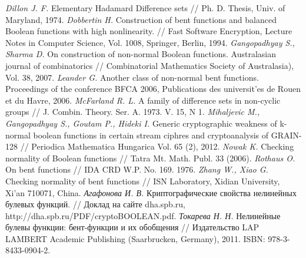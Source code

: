 \begin{thebibliography}{99}
 {\it Dillon J. F.} Elementary Hadamard Difference sets // Ph. D. Thesis, Univ. of Maryland, 1974.
 {\it Dobbertin H.} Construction of bent functions and balanced Boolean functions with high nonlinearity. // Fast Software Encryption, Lecture Notes in Computer Science, Vol. 1008, Springer, Berlin, 1994.
 {\it Gangopadhyay S., Sharma D.} On construction of non-normal Boolean functions. Australasian journal of combinatorics // Combinatorial Mathematics Society of Australasia), Vol. 38, 2007.
 {\it Leander G.} Another class of non-normal bent functions. Proceedings of the conference BFCA 2006, Publications des universit'es de Rouen et du Havre, 2006.
 {\it McFarland R. L.} A family of difference sets in non-cyclic groups // J. Combin. Theory. Ser. A. 1973. V. 15, N 1.
 {\it Mihaljevic M., Gangopadhyay S., Goutam P., Hideki I.} Generic cryptographic weakness of k-normal boolean functions in certain stream ciphres and cryptoanalysis of GRAIN-128 // Periodica Mathematica Hungarica Vol. 65 (2), 2012.
 {\it Nowak K.} Checking normality of Boolean functions // Tatra Mt. Math. Publ. 33 (2006).
 {\it Rothaus O.} On bent functions // IDA CRD W.P. No. 169. 1976.
 {\it Zhang W., Xiao G.} Checking normality of bent functions // ISN Laboratory, Xidian University, Xi’an 710071, China.
 {\it Агафонова И. В.} Криптографические свойства нелинейных булевых функций. // Доклад на сайте dha.spb.ru, http://dha.spb.ru/PDF/cryptoBOOLEAN.pdf.
 {\it Токарева Н. Н.} Нелинейные булевы функции: бент-функции и их обобщения // Издательство LAP LAMBERT Academic Publishing (Saarbrucken, Germany), 2011. ISBN: 978-3-8433-0904-2.

\end{thebibliography}
